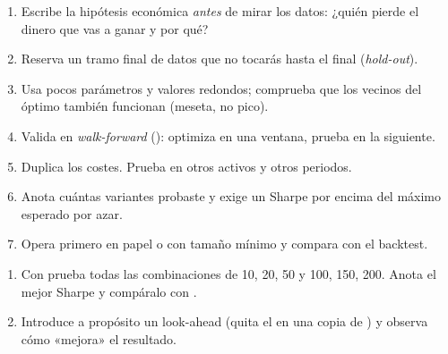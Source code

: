 \begin{practica}
\begin{enumerate}
\item Escribe la hipótesis económica \emph{antes} de mirar los datos: ¿quién pierde el dinero que vas a ganar y por qué?
\item Reserva un tramo final de datos que no tocarás hasta el final (\emph{hold-out}).
\item Usa pocos parámetros y valores redondos; comprueba que los vecinos del óptimo también funcionan (meseta, no pico).
\item Valida en \emph{walk-forward} (): optimiza en una ventana, prueba en la siguiente.
\item Duplica los costes. Prueba en otros activos y otros periodos.
\item Anota cuántas variantes probaste y exige un Sharpe por encima del máximo esperado por azar.
\item Opera primero en papel o con tamaño mínimo y compara con el backtest.
\end{enumerate}
\end{practica}

\begin{ejercicios}
\begin{enumerate}
\item Con  prueba todas las combinaciones de  10, 20, 50 y  100, 150, 200. Anota el mejor Sharpe y compáralo con .
\item Introduce a propósito un look-ahead (quita el  en una copia de ) y observa cómo «mejora» el resultado.
\end{enumerate}
\end{ejercicios}
